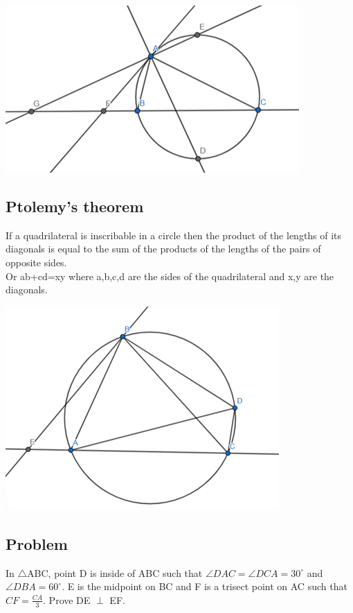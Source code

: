 \documentclass{article}
\begin{document}
\includegraphics{Picture19.png}

\pagebreak

\subsection{Ptolemy's theorem}

If a quadrilateral is inscribable in a circle then the product of the lengths of its diagonals is equal to the sum of the products of the lengths of the pairs of opposite sides.
\\Or ab+cd=xy where a,b,c,d are the sides of the quadrilateral and x,y are the diagonals.

\includegraphics{Picture20.png}

\pagebreak

\subsection{Problem}
In \(\triangle\)ABC, point D is inside of ABC such that \(\angle DAC = \angle DCA=30^{\circ} \) and \(\angle DBA=60^{\circ}\). E is the midpoint on BC and F is a trisect point on AC such that \(CF = \frac{CA}{3} \). Prove DE \(\perp\) EF.
\end{document}
